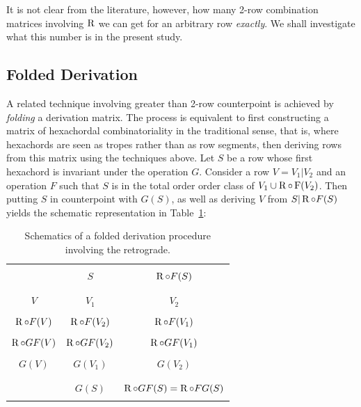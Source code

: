 It is not clear from the literature, however, how many 2-row combination matrices involving $\operatorname{R}$ we can get for an arbitrary row \emph{exactly}. We shall investigate what this number is in the present study.

\subsection{Folded Derivation}

A related technique involving greater than 2-row counterpoint is achieved by \emph{folding} a derivation matrix. The process is equivalent to first constructing a matrix of hexachordal combinatoriality in the traditional sense, that is, where hexachords are seen as tropes rather than as row segments, then deriving rows from this matrix using the techniques above. Let $S$ be a row whose first hexachord is invariant under the operation $G$. Consider a row $V = V_1 | V_2$ and an operation $F$ such that $S$ is in the total order order class of $V_1 \cup \operatorname{R} \circ \operatorname{F}(V_2)$. Then putting $S$ in counterpoint with $G(S)$, as well as deriving $V$ from $S | \operatorname{R}\circ F(S)$ yields the schematic representation in Table~\ref{derivation-folded}:

\begin{table}[htbp]
    \caption[Folded Derivation Involving the Retrograde]{Schematics of a folded derivation procedure involving the retrograde.}
    \label{derivation-folded}
    \centering
    \vspace{12pt}
    \begin{tabular}{c|cc}
        \hline\\
        & $S$ & $\operatorname{R} \circ F(S)$\\\\
        \hline\\
        $V$ & $V_1$ & $V_2$ \\\\
        $\operatorname{R} \circ F(V)$ & $\operatorname{R} \circ F(V_2)$ & $\operatorname{R} \circ F(V_1)$ \\\\
        $\operatorname{R} \circ GF(V)$ & $\operatorname{R} \circ GF(V_2)$ & $\operatorname{R} \circ GF(V_1)$ \\\\
        $G(V)$ & $G(V_1)$ & $G(V_2)$ \\\\
        \hline\\
        & $G(S)$ & $\operatorname{R} \circ GF(S) = \operatorname{R} \circ FG(S)$ \\\\
        \hline
    \end{tabular}
\end{table}

